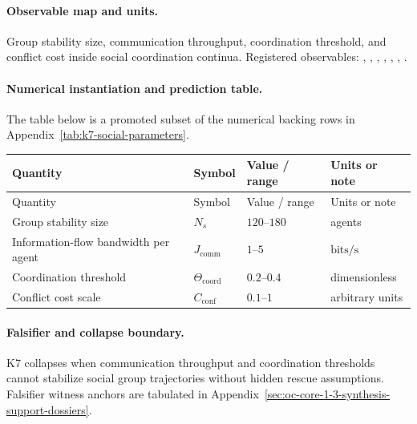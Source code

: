 \paragraph{Observable map and units.}
Group stability size, communication throughput, coordination threshold, and conflict cost inside social coordination continua.
Registered observables: , \allowbreak {}, \allowbreak {}, \allowbreak {}, \allowbreak {}, \allowbreak {}, \allowbreak {}.

\paragraph{Numerical instantiation and prediction table.}
The table below is a promoted subset of the numerical backing rows in Appendix~\ref{tab:k7-social-parameters}.
\begin{longtable}{@{}L{0.27\textwidth}L{0.15\textwidth}L{0.24\textwidth}L{0.16\textwidth}@{}}
\toprule
Quantity & Symbol & Value / range & Units or note \\
\midrule
\endfirsthead
\toprule
Quantity & Symbol & Value / range & Units or note \\
\midrule
\endhead
Group stability size & $\scriptstyle N_s$ & $120\text{--}180$ & agents \\
Information-flow bandwidth per agent & $\scriptstyle J_{\mathrm{comm}}$ & $1\text{--}5$ & $\mathrm{bits/s}$ \\
Coordination threshold & $\scriptstyle \Theta_{\mathrm{coord}}$ & $0.2\text{--}0.4$ & dimensionless \\
Conflict cost scale & $\scriptstyle C_{\mathrm{conf}}$ & $0.1\text{--}1$ & arbitrary units \\
\bottomrule
\end{longtable}

\paragraph{Falsifier and collapse boundary.}
K7 collapses when communication throughput and coordination thresholds cannot stabilize social group trajectories without hidden rescue assumptions.
Falsifier witness anchors are tabulated in Appendix~\ref{sec:oc-core-1-3-synthesis-support-dossiers}.

